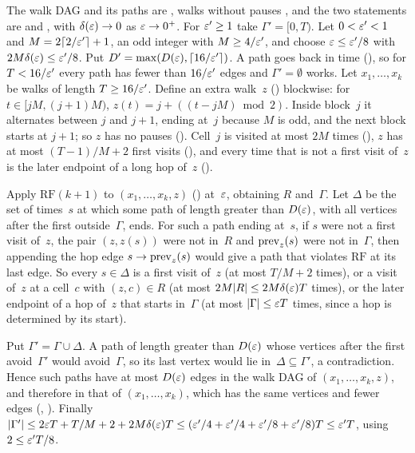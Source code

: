 \begin{outline}
The walk DAG and its paths are , walks without pauses , and the two statements are
 and , with $\delta(\varepsilon)\to0$ as $\varepsilon\to0^+$. For $\varepsilon'\ge1$ take $\Gamma'=[0,T)$. Let
$0<\varepsilon'<1$ and $M=2\lceil2/\varepsilon'\rceil+1$, an odd integer with $M\ge4/\varepsilon'$, and choose $\varepsilon\le\varepsilon'/8$ with
$2M\delta(\varepsilon)\le\varepsilon'/8$. Put $D'=\max(D(\varepsilon),\lceil16/\varepsilon'\rceil)$. A path goes back in time
(), so for $T<16/\varepsilon'$ every path has fewer than $16/\varepsilon'$ edges and $\Gamma'=\emptyset$ works. Let
$x_1,\dots,x_k$ be walks of length $T\ge16/\varepsilon'$. Define an extra walk~$z$ () blockwise: for $t\in[jM,(j+1)M)$,
$z(t)=j+((t-jM)\bmod2)$. Inside block~$j$ it alternates between $j$ and $j+1$, ending at~$j$ because $M$ is odd, and the
next block starts at $j+1$; so $z$ has no pauses (). Cell~$j$ is visited at most $2M$ times
(), $z$ has at most $(T-1)/M+2$ first visits (), and every time that is
not a first visit of~$z$ is the later endpoint of a long hop of~$z$ ().

Apply $\mathrm{RF}(k+1)$ to $(x_1,\dots,x_k,z)$ () at~$\varepsilon$, obtaining $R$ and~$\Gamma$. Let $\Delta$ be the set
of times~$s$ at which some path of length greater than $D(\varepsilon)$, with all vertices after the first outside~$\Gamma$, ends.
For such a path ending at~$s$, if $s$ were not a first visit of~$z$, the pair $(z,z(s))$ were not in~$R$ and $\mathrm{prev}_z(s)$
were not in~$\Gamma$, then appending the hop edge $s\to\mathrm{prev}_z(s)$ would give a path that violates $\mathrm{RF}$ at its last
edge. So every $s\in\Delta$ is a first visit of~$z$ (at most $T/M+2$ times), or a visit of~$z$ at a cell~$c$ with
$(z,c)\in R$ (at most $2M\lvert R \rvert\le2M\delta(\varepsilon)T$ times), or the later endpoint of a hop of~$z$ that starts in~$\Gamma$ (at
most $\lvert \Gamma \rvert\le\varepsilon T$ times, since a hop is determined by its start).

Put $\Gamma'=\Gamma\cup\Delta$. A path of length greater than $D(\varepsilon)$ whose vertices after the first avoid~$\Gamma'$
would avoid~$\Gamma$, so its last vertex would lie in~$\Delta\subseteq\Gamma'$, a contradiction. Hence such paths have at
most $D(\varepsilon)$ edges in the walk DAG of $(x_1,\dots,x_k,z)$, and therefore in that of $(x_1,\dots,x_k)$, which has the same
vertices and fewer edges (, ). Finally
$\lvert \Gamma' \rvert\le2\varepsilon T+T/M+2+2M\delta(\varepsilon)T\le(\varepsilon'/4+\varepsilon'/4+\varepsilon'/8+\varepsilon'/8)T\le\varepsilon'T$, using $2\le\varepsilon'T/8$.
\end{outline}

